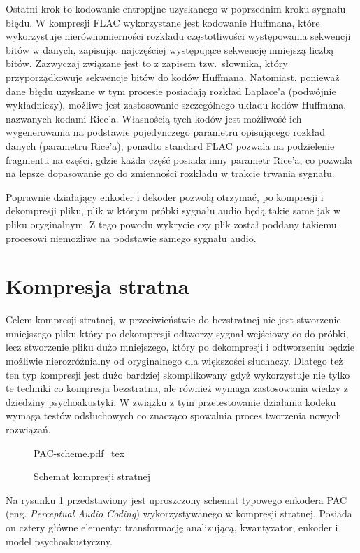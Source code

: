 \documentclass[pl,12pt]{aghdpl}
\let\Oldsection\section%
\renewcommand{\section}{\FloatBarrier\Oldsection}
\begin{document}
Ostatni krok to kodowanie entropijne uzyskanego w poprzednim kroku sygnału
błędu. W kompresji FLAC wykorzystane jest kodowanie Huffmana, które
wykorzystuje nierównomierności rozkładu częstotliwości występowania sekwencji
bitów w danych, zapisując najczęściej występujące sekwencję mniejszą liczbą
bitów. Zazwyczaj związane jest to z zapisem tzw.\ słownika, który
przyporządkowuje sekwencje bitów do kodów Huffmana. Natomiast, ponieważ dane
błędu uzyskane w tym procesie posiadają rozkład Laplace'a (podwójnie
wykładniczy), możliwe jest zastosowanie szczególnego układu kodów Huffmana,
nazwanych kodami Rice'a. Własnością tych kodów jest możliwość ich wygenerowania
na podstawie pojedynczego parametru opisującego rozkład danych (parametru
Rice'a), ponadto standard FLAC pozwala na podzielenie fragmentu na części,
gdzie każda część posiada inny parametr Rice'a, co pozwala na lepsze
dopasowanie go do zmienności rozkładu w trakcie trwania sygnału.

Poprawnie działający enkoder i dekoder pozwolą otrzymać, po kompresji i
dekompresji pliku, plik w którym próbki sygnału audio będą takie same jak w
pliku oryginalnym. Z tego powodu wykrycie czy plik został poddany takiemu
procesowi niemożliwe na podstawie samego sygnału audio.

\section{Kompresja stratna}

Celem kompresji stratnej, w przeciwieństwie do bezstratnej nie jest stworzenie
mniejszego pliku który po dekompresji odtworzy sygnał wejściowy co do próbki, lecz
stworzenie pliku dużo mniejszego, który po dekompresji i odtworzeniu będzie
możliwie nierozróżnialny od oryginalnego dla większości słuchaczy. Dlatego też
ten typ kompresji jest dużo bardziej skomplikowany gdyż wykorzystuje nie tylko
te techniki co kompresja bezstratna, ale również wymaga zastosowania wiedzy
z dziedziny psychoakustyki. W związku z tym przetestowanie działania kodeku
wymaga testów odsłuchowych co znacząco spowalnia proces tworzenia nowych
rozwiązań.

\begin{figure}[!tbh]
  \centering
  {PAC-scheme.pdf_tex}
  \caption{Schemat kompresji stratnej}
  \label{fig:PAC_scheme}
\end{figure}

Na rysunku \ref{fig:PAC_scheme} przedstawiony jest uproszczony schemat typowego
enkodera PAC (eng. \textit{Perceptual Audio Coding}) wykorzystywanego w
kompresji stratnej. Posiada on cztery główne elementy: transformację
analizującą, kwantyzator, enkoder i model psychoakustyczny.
\end{document}
